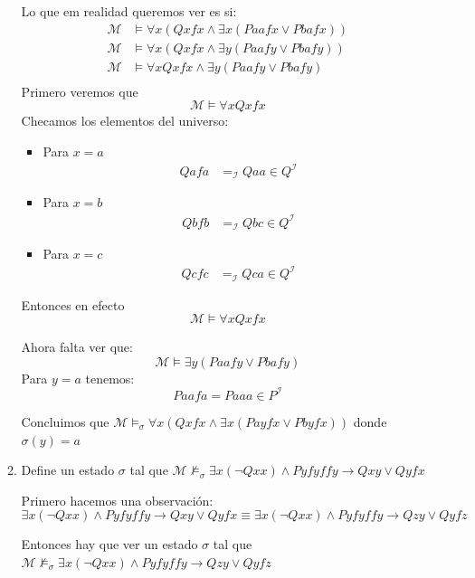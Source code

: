 \documentclass[11pt,letterpaper]{article}
\begin{document}
\begin{enumerate}
\begin{enumerate}
    Lo que em realidad queremos ver es si:
    \begin{align*}
      \mathcal{M} &\models \forall x(Qxfx \land \exists x
      (P aafx \lor P bafx))\\
      \mathcal{M} &\models \forall x (Qxfx \land \exists y
      (P aafy \lor P bafy))\\
      \mathcal{M} &\models \forall x Qxfx \land \exists y
      (P aafy \lor P bafy)\\
    \end{align*}
    Primero veremos que
    $$ \mathcal{M} \models \forall x Qxfx$$
    Checamos los elementos del universo:
    \begin{itemize}
    \item Para $x= a$
      \begin{align*}
        Qafa &=_\mathcal{I} Qaa \in Q^\mathcal{I}
      \end{align*}
    \item Para $x= b$
      \begin{align*}
        Qbfb &=_\mathcal{I} Qbc \in Q^\mathcal{I}
      \end{align*}
    \item Para $x= c$
      \begin{align*}
        Qcfc &=_\mathcal{I} Qca \in Q^\mathcal{I}
      \end{align*}
    \end{itemize}
    Entonces en efecto
    $$ \mathcal{M} \models \forall x Qxfx$$

    Ahora falta ver que:
    $$ \mathcal{M} \models \exists y (P aafy \lor P bafy)$$
    Para $y=a$ tenemos:
    $$ Paafa = Paaa \in P^\mathcal{I}$$

    Concluimos que $\mathcal{M} \models_\sigma \forall x(Qxfx \land \exists x
    (P ayfx \lor P byfx))$ donde $\sigma(y) = a$

    \hfill\break
  \item Define un estado $\sigma$ tal que
    $\mathcal{M} \not\models_\sigma \exists x(\neg Qxx) \land P yfyffy
    \rightarrow Qxy \lor Qyfx$

    Primero hacemos una observación:
    $$\exists x(\neg Qxx) \land P yfyffy \rightarrow Qxy \lor Qyfx
    \equiv \exists x(\neg Qxx) \land P yfyffy \rightarrow Qzy \lor Qyfz$$
    
    Entonces hay que ver un estado $\sigma$ tal que
    $\mathcal{M} \not\models_\sigma \exists x(\neg Qxx) \land P yfyffy
    \rightarrow Qzy \lor Qyfz$


\end{enumerate}
\end{enumerate}
\end{document}
